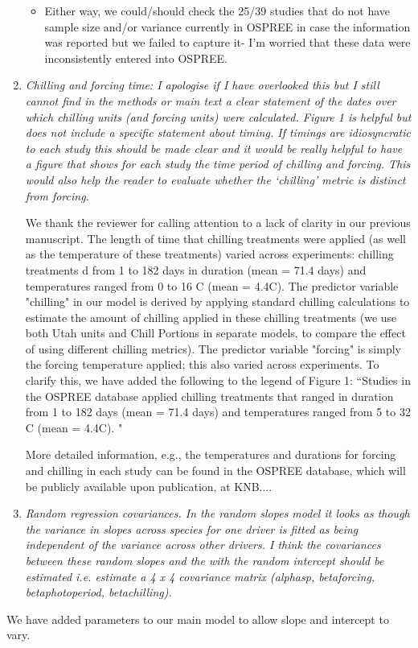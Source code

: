 \documentclass[11pt, a4paper]{article}
\begin{document}
\begin{enumerate}
\begin{itemize}
\item Either way, we could/should check the 25/39 studies that do not have sample size and/or variance currently in OSPREE in case the information was reported but we failed to capture it- I'm worried that these data were inconsistently entered into OSPREE. 
\end{itemize}
\item \emph{Chilling and forcing time: I apologise if I have overlooked this but I still cannot find in the
methods or main text a clear statement of the dates over which chilling units (and forcing
units) were calculated. Figure 1 is helpful but does not include a specific statement about
timing. If timings are idiosyncratic to each study this should be made clear and it would be
really helpful to have a figure that shows for each study the time period of chilling and forcing.
This would also help the reader to evaluate whether the `chilling' metric is distinct from
forcing.}
\par We thank the reviewer for calling attention to a lack of clarity in our previous manuscript. The length of time that chilling treatments were applied (as well as the temperature of these treatments) varied across experiments:  chilling treatments 
d from 1 to 182 days in duration (mean = 71.4 days) and temperatures ranged from  0 to 16 \degree C (mean = 4.4\degree C). The predictor variable "chilling" in our model is derived by applying standard chilling calculations to estimate the amount of chilling applied in these chilling treatments (we use both Utah units and Chill Portions in separate models, to compare the effect of using different chilling metrics). The predictor variable "forcing" is simply the forcing temperature applied; this also varied across experiments. 
To clarify this, we have added the following to the legend of Figure 1:
``Studies in the OSPREE database applied chilling treatments that ranged in duration from 1 to 182 days (mean = 71.4 days) and temperatures ranged from  5 to 32 \degree C (mean = 4.4\degree C). "

More detailed information, e.g., the temperatures and durations for forcing and chilling in each study can be found in the OSPREE database, which will be  publicly available upon publication, at KNB....

\item \emph{Random regression covariances. In the random slopes model it looks as though the variance in
slopes across species for one driver is fitted as being independent of the variance across other
drivers. I think the covariances between these random slopes and the with the random
intercept should be estimated i.e. estimate a 4 x 4 covariance matrix (alphasp, betaforcing,
betaphotoperiod, betachilling).}
\end{enumerate}
\par We have added parameters to our main model to allow slope and intercept to vary. 
\end{document}
